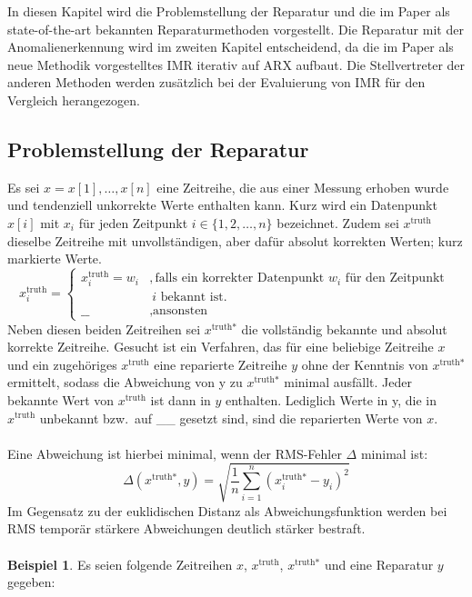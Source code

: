 In diesen Kapitel wird die Problemstellung der Reparatur und die im Paper als
state-of-the-art bekannten Reparaturmethoden vorgestellt. Die Reparatur mit
der Anomalienerkennung wird im zweiten Kapitel entscheidend, da die im Paper als
neue Methodik vorgestelltes IMR iterativ auf ARX aufbaut.  Die Stellvertreter
der anderen Methoden werden zusätzlich bei der Evaluierung von IMR für den
Vergleich herangezogen.

\subsection{Problemstellung der Reparatur}

Es sei $x = x[1],\dots,x[n]$ eine Zeitreihe, die aus einer Messung erhoben
wurde und tendenziell unkorrekte Werte enthalten kann. Kurz wird ein
Datenpunkt $x[i]$ mit $x_i$ für jeden Zeitpunkt $i \in
\{1,2,\dots,n\}$ bezeichnet. Zudem sei $x^{\text{truth}}$ dieselbe Zeitreihe
mit unvollständigen, aber dafür absolut korrekten Werten; kurz markierte Werte.
\[
    x^{\text{truth}}_i = \left\{
\begin{array}{ll}
    x^{\text{truth}}_i = w_i&, \text{falls ein korrekter Datenpunkt }w_i
    \text{ für den Zeitpunkt }\\
&~ i \text{ bekannt ist.}\\
    \text{\_\_}&, \text{ansonsten}
\end{array}
 \right.
\]
Neben diesen beiden Zeitreihen sei $x^{\text{truth*}}$ die vollständig bekannte
und absolut korrekte Zeitreihe. Gesucht ist ein Verfahren, das für eine beliebige
Zeitreihe $x$ und ein zugehöriges $x^{\text{truth}}$ eine reparierte Zeitreihe
$y$ ohne der Kenntnis von $x^{\text{truth*}}$ ermittelt, sodass die Abweichung von y
zu $x^{\text{truth*}}$ minimal ausfällt. Jeder bekannte Wert von
$x^{\text{truth}}$ ist dann in $y$ enthalten. Lediglich Werte in y, die in
$x^{\text{truth}}$ unbekannt bzw.\ auf \_\_ gesetzt sind, sind die reparierten
Werte von $x$.
\\
\\
Eine Abweichung ist hierbei minimal, wenn der RMS-Fehler $\Delta$ minimal ist:
\[
    \Delta\left(x^{\text{truth*}}, y\right) = \sqrt{\frac{1}{n} \sum_{i=1}^n \left( x^{\text{truth*}}_i - y_i \right)^2}
\]
Im Gegensatz zu der euklidischen Distanz als Abweichungsfunktion werden bei RMS temporär stärkere Abweichungen deutlich stärker bestraft.
~\\
\\
\textbf{Beispiel 1}. Es seien folgende Zeitreihen $x$, $x^{\text{truth}}$, $x^{\text{truth*}}$ und eine Reparatur $y$ gegeben:
